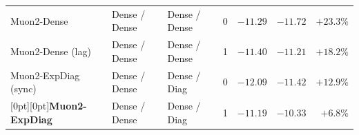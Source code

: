 \begin{table}[!htb]
\begin{tabularx}{\textwidth}{@{}>{\raggedright\arraybackslash}Xllcrrr@{}}
Muon2-Dense & Dense / Dense & Dense / Dense & 0 & $-11.29$ & $-11.72$ & $+23.3\%$ \\
Muon2-Dense (lag) & Dense / Dense & Dense / Dense & 1 & $-11.40$ & $-11.21$ & $+18.2\%$ \\
Muon2-ExpDiag (sync) & Dense / Dense & Dense / Diag & 0 & $\mathbf{-12.09}$ & $-11.42$ & $+12.9\%$ \\
\rowcolor{rowtint}[0pt][0pt]\textbf{Muon2-ExpDiag} & Dense / Dense & Dense / Diag & 1 & $\mathbf{-11.19}$ & $\mathbf{-10.33}$ & $+6.8\%$ \\
\bottomrule\end{tabularx}
\end{table}
